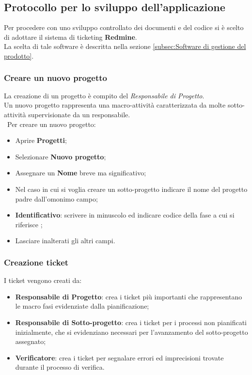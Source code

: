 \subsection{Protocollo per lo sviluppo dell'applicazione} 
Per procedere con uno sviluppo controllato dei documenti e del codice si è scelto di adottare il sistema di ticketing \textbf{Redmine}.\\ 
La scelta di tale software è descritta nella sezione \ref{subsec:Software di gestione del prodotto}.

\subsubsection{Creare un nuovo progetto} 

La creazione di un progetto è compito del \emph{Responsabile di Progetto}.\\ 
Un nuovo progetto rappresenta una macro-attività caratterizzata da molte sotto-attività supervisionate da un responsabile.\\\
Per creare un nuovo progetto:
\begin{itemize}
\item Aprire \textbf{Progetti}; 
\item Selezionare \textbf{Nuovo progetto}; 
\item Assegnare un \textbf{Nome} breve ma significativo; 
\item Nel caso in cui si voglia creare un sotto-progetto indicare il nome del progetto padre dall’omonimo campo; 
\item \textbf{Identificativo}: scrivere in minuscolo ed indicare codice\ped{g} della fase a cui si riferisce ;
\item Lasciare inalterati gli altri campi. 
\end{itemize}
 
\subsubsection{Creazione ticket}
 
  I ticket vengono creati da:
 \begin{itemize}
 

    \item \textbf{Responsabile di Progetto}: crea i ticket più importanti che rappresentano le macro fasi evidenziate dalla pianificazione; 
	\item \textbf{Responsabile di Sotto-progetto}: crea i ticket per i processi non pianificati inizialmente, che si evidenziano necessari per l’avanzamento del sotto-progetto\ped{g} assegnato; 
	\item \textbf{Verificatore}: crea i ticket\ped{g} per segnalare errori ed imprecisioni trovate durante il processo\ped{g} di verifica. 
 \end{itemize}


